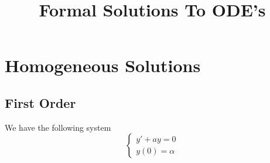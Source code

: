 \documentclass{article}
\title{Formal Solutions To ODE's}
\date{}
\begin{document}
\maketitle

\section{Homogeneous Solutions}

\subsection{First Order}

We have the following system
\[
	\begin{cases}
	y'+ay=0\\
	y(0)=\alpha
	\end{cases}
\]
\end{document}
